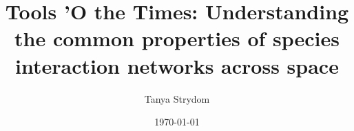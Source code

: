\documentclass[12pt,twoside,phd]{dms}
\numberwithin{equation}{section}
\numberwithin{table}{chapter}
\numberwithin{figure}{chapter}
\begin{document}



\title{Tools 'O the Times: Understanding the common properties of species interaction networks across space}

\author{Tanya Strydom}



\date{\today} %










\end{document}
